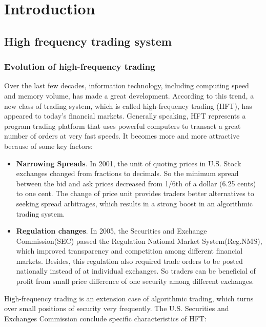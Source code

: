 \chapter{Introduction}
\section{High frequency trading system}
\subsection{Evolution of high-frequency trading}
Over the last few decades, information technology, including computing speed and memory volume, has made a great development. According to this trend, a new class of trading system, which is called high-frequency trading (HFT), has appeared to today's financial markets. Generally speaking,  HFT represents a program trading platform that uses powerful computers to transact a great number of orders at very fast speeds. It becomes more and more attractive  because of some key factors:\\
\begin{itemize}
\item \textbf{Narrowing Spreads}. In 2001, the unit of quoting prices in U.S. Stock exchanges changed from fractions to decimals. So the minimum spread between the bid and ask prices decreased from 1/6th of a dollar (6.25 cents) to one cent. The change of price unit provides traders better alternatives to seeking spread arbitrages, which results in a strong boost in an algorithmic trading system.  \\
\item \textbf{Regulation changes}. In 2005, the Securities and Exchange Commission(SEC) passed the Regulation National Market System(Reg.NMS), which improved transparency and competition among different financial markets. Besides, this regulation also required trade orders to be posted nationally instead of at individual exchanges. So traders can be beneficial of profit from small price difference of one security among different exchanges. \\
\end{itemize}

High-frequency trading is an extension case of algorithmic trading, which turns over small positions of security very frequently. The U.S. Securities and Exchanges Commission conclude specific characteristics of HFT:\\

